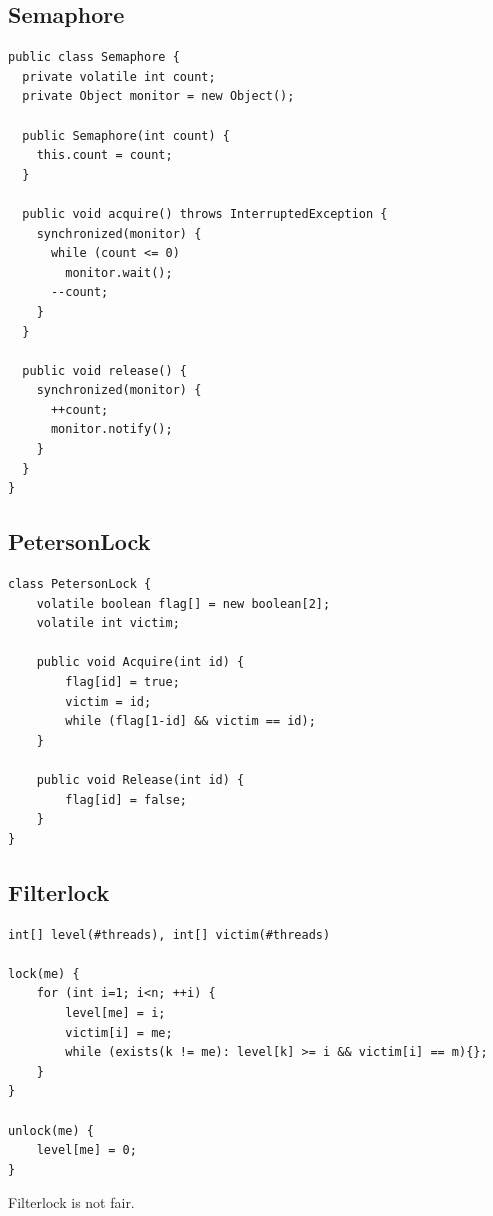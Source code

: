 \documentclass{article}
\begin{document}
\subsection{Semaphore}
\begin{lstlisting}[style=java]
public class Semaphore {
  private volatile int count;
  private Object monitor = new Object();

  public Semaphore(int count) {
    this.count = count;
  }
  
  public void acquire() throws InterruptedException {
    synchronized(monitor) {
      while (count <= 0)
        monitor.wait();
      --count;
    }
  }

  public void release() {
    synchronized(monitor) {
      ++count;
      monitor.notify();
    }
  }
}
\end{lstlisting}

\subsection{PetersonLock}
\begin{lstlisting}[style=java]
class PetersonLock {
    volatile boolean flag[] = new boolean[2];
    volatile int victim;

    public void Acquire(int id) {
        flag[id] = true;
        victim = id;
        while (flag[1-id] && victim == id);
    }

    public void Release(int id) {
        flag[id] = false;
    }
}
\end{lstlisting}

\subsection{Filterlock}
\begin{lstlisting}[style=java]
int[] level(#threads), int[] victim(#threads)

lock(me) {
    for (int i=1; i<n; ++i) {
        level[me] = i;
        victim[i] = me;
        while (exists(k != me): level[k] >= i && victim[i] == m){};
    }
}

unlock(me) {
    level[me] = 0;
}
\end{lstlisting}

Filterlock is not fair.
\end{document}
